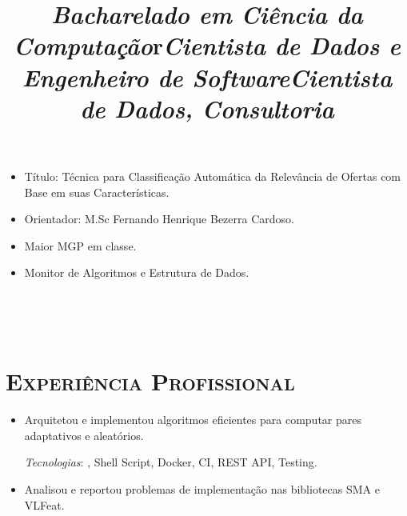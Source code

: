 \begin{resume}
\title{\emph{Bacharelado em Ci\^encia da Computa\c{c}\~ao}}
\begin{position}
\begin{itemize}\small
\vspace{1mm}
\item T\'itulo: T\'ecnica para Classifica\c{c}\~ao Autom\'atica da Relev\^ancia de Ofertas com Base em suas Caracter\'isticas.
\item Orientador: M.Sc Fernando Henrique Bezerra Cardoso.
\item Maior MGP em classe.
\item Monitor de Algoritmos e Estrutura de Dados.
\end{itemize}
\end{position}


\begin{formatb}
  \\
  \title{r}\\
\end{formatb}

\section{\textsc{Experi\^encia Profissional}}

\title{\emph{Cientista de Dados e Engenheiro de Software}}
\begin{position}
\vspace{1mm}
\begin{itemize}\small
\item Arquitetou e implementou algoritmos eficientes para computar pares
  adaptativos e aleat\'orios.

\vspace{1mm}
{\small \emph{Tecnologias}: \Cplusplus, Shell Script, Docker, CI, REST API, Testing\@.}
\end{itemize}
\end{position}

\title{\emph{Cientista de Dados, Consultoria}}
\begin{position}
\vspace{1mm}
\begin{itemize}\small
\item Analisou e reportou problemas de implementa\c{c}\~ao nas bibliotecas SMA e VLFeat.
\end{itemize}
\end{position}


\end{resume}
